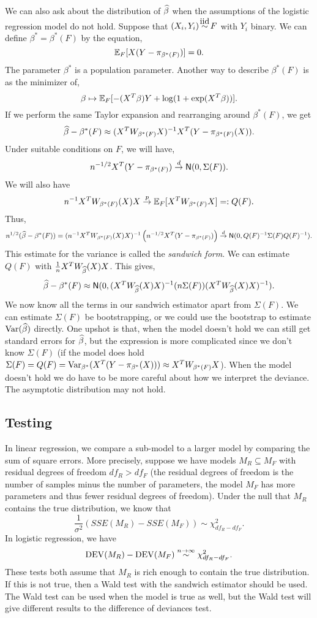 We can also ask about the distribution of $\widehat{\beta}$ when the assumptions of the logistic regression model do not hold. Suppose that $(X_i,Y_i)\iid F$ with $Y_i$ binary. We can define $\beta^* = \beta^*(F)$ by the equation,
\[{\mathbb{E}}_F[X(Y-\pi_{\beta^*(F)})] = 0. \]
The parameter $\beta^*$ is a population parameter. Another way to describe $\beta^*(F)$ is as the minimizer of,
\[\beta \mapsto {\mathbb{E}}_F[-(X^T\beta)Y+\log(1+\exp(X^T\beta))]. \]
If we perform the same Taylor expansion and rearranging around $\beta^*(F)$, we get
\[\widehat{\beta}-\beta^*(F) \approx (X^TW_{\beta^*(F)}X)^{-1}X^T(Y-\pi_{\beta^*(F)}(X)).\]
Under suitable conditions on $F$, we will have,
\[n^{-1/2}X^T(Y-\pi_{\beta^*(F)}) \stackrel{d}{\to} \mathsf{N}(0,\Sigma(F)).\]
We will also have
\[n^{-1}X^TW_{\beta^*(F)}(X)X \stackrel{p}{\to} {\mathbb{E}}_F[X^TW_{\beta^*(F)}X] =: Q(F). \]
Thus,
\[n^{1/2}(\widehat{\beta}-\beta^*(F)) = (n^{-1}X^TW_{\beta^*(F)}(X)X)^{-1}\left(n^{-1/2}X^T(Y-\pi_{\beta^*(F)})\right) \stackrel{d}{\to} \mathsf{N}(0,Q(F)^{-1}\Sigma(F)Q(F)^{-1}). \]
This estimate for the variance is called the \emph{sandwich form}. We can estimate $Q(F)$ with $\frac{1}{n}X^TW_{\widehat{\beta}}(X)X$. This gives,
\[\widehat{\beta}-\beta^*(F) \approx \mathsf{N}(0, (X^TW_{\widehat{\beta}}(X)X)^{-1}(n\Sigma(F))(X^TW_{\widehat{\beta}}(X)X)^{-1}). \]
We now know all the terms in our sandwich estimator apart from $\Sigma(F)$. We can estimate $\Sigma(F)$ be bootstrapping, or we could use the bootstrap to estimate $\operatorname{Var}(\widehat{\beta})$ directly. One upshot is that, when the model doesn't  hold we can still get standard errors for $\widehat{\beta}$, but the expression is more complicated since we don't know $\Sigma(F)$ (if the model does hold $\Sigma(F) = Q(F) = \operatorname{Var}_{\beta^*}(X^T(Y-\pi_{\beta^*}(X))) \approx X^TW_{\beta^*(F)}X$).  When the model doesn't hold we do have to be  more careful about how we interpret the deviance. The asymptotic distribution may not hold.

\subsection{Testing}
In linear regression, we compare a sub-model to a larger model by comparing the sum of square errors. More precisely, suppose we have models $M_R \subseteq M_F$ with residual degrees of freedom $df_{R} > df_{F}$ (the residual degrees of freedom is the number of samples minus the number of parameters,  the model $M_F$ has more parameters and thus fewer residual degrees of  freedom). Under the null that $M_R$ contains the true distribution, we know that
\[\frac{1}{\sigma^2}\left(SSE(M_R)-SSE(M_F)\right) \sim \chi^2_{df_R-df_F}. \] 
In logistic regression, we have
\[\operatorname{DEV}(M_R)-\operatorname{DEV}(M_F) \stackrel{n \to \infty}{\sim} \chi^2_{df_R-df_F}. \]
These tests both assume that $M_R$ is rich enough to contain the true distribution. If this is not true, then a Wald test with the sandwich estimator should be used. The Wald test can be used when the model is true as well, but the Wald test will give different results to the  difference of deviances test.
